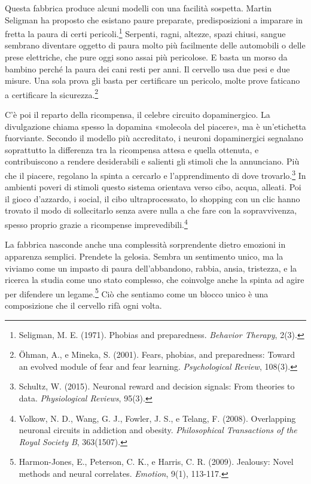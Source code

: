 Questa fabbrica produce alcuni modelli con una facilità sospetta. Martin Seligman ha proposto che esistano paure preparate, predisposizioni a imparare in fretta la paura di certi pericoli.\footnote{Seligman, M. E. (1971). Phobias and preparedness. \textit{Behavior Therapy}, 2(3).} Serpenti, ragni, altezze, spazi chiusi, sangue sembrano diventare oggetto di paura molto più facilmente delle automobili o delle prese elettriche, che pure oggi sono assai più pericolose. E basta un morso da bambino perché la paura dei cani resti per anni. Il cervello usa due pesi e due misure. Una sola prova gli basta per certificare un pericolo, molte prove faticano a certificare la sicurezza.\footnote{Öhman, A., e Mineka, S. (2001). Fears, phobias, and preparedness: Toward an evolved module of fear and fear learning. \textit{Psychological Review}, 108(3).}

C'è poi il reparto della ricompensa, il celebre circuito dopaminergico. La divulgazione chiama spesso la dopamina «molecola del piacere», ma è un'etichetta fuorviante. Secondo il modello più accreditato, i neuroni dopaminergici segnalano soprattutto la differenza tra la ricompensa attesa e quella ottenuta, e contribuiscono a rendere desiderabili e salienti gli stimoli che la annunciano. Più che il piacere, regolano la spinta a cercarlo e l'apprendimento di dove trovarlo.\footnote{Schultz, W. (2015). Neuronal reward and decision signals: From theories to data. \textit{Physiological Reviews}, 95(3).} In ambienti poveri di stimoli questo sistema orientava verso cibo, acqua, alleati. Poi il gioco d'azzardo, i social, il cibo ultraprocessato, lo shopping con un clic hanno trovato il modo di sollecitarlo senza avere nulla a che fare con la sopravvivenza, spesso proprio grazie a ricompense imprevedibili.\footnote{Volkow, N. D., Wang, G. J., Fowler, J. S., e Telang, F. (2008). Overlapping neuronal circuits in addiction and obesity. \textit{Philosophical Transactions of the Royal Society B}, 363(1507).}

La fabbrica nasconde anche una complessità sorprendente dietro emozioni in apparenza semplici. Prendete la gelosia. Sembra un sentimento unico, ma la viviamo come un impasto di paura dell'abbandono, rabbia, ansia, tristezza, e la ricerca la studia come uno stato complesso, che coinvolge anche la spinta ad agire per difendere un legame.\footnote{Harmon-Jones, E., Peterson, C. K., e Harris, C. R. (2009). Jealousy: Novel methods and neural correlates. \textit{Emotion}, 9(1), 113-117.} Ciò che sentiamo come un blocco unico è una composizione che il cervello rifà ogni volta.

